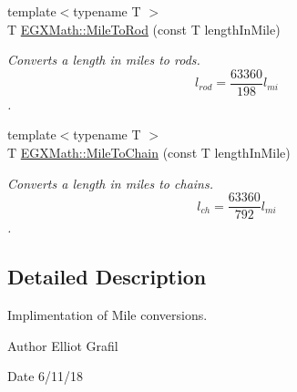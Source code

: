 \begin{DoxyCompactItemize}
{\footnotesize template$<$typename T $>$ }\\T \mbox{\hyperlink{group___e_g_x_math-_conversions-_length_conversions-_imperial-_mile-_surveyors_gae7e968004f761942f7d296ef66f1f93a}{E\+G\+X\+Math\+::\+Mile\+To\+Rod}} (const T length\+In\+Mile)
\begin{DoxyCompactList}\small\item\em Converts a length in miles to rods. \[ l_{rod}= \frac{63360}{198} l_{mi} \]. \end{DoxyCompactList}\item 
{\footnotesize template$<$typename T $>$ }\\T \mbox{\hyperlink{group___e_g_x_math-_conversions-_length_conversions-_imperial-_mile-_surveyors_gae3b09627ed639defe81e025bf827c8d7}{E\+G\+X\+Math\+::\+Mile\+To\+Chain}} (const T length\+In\+Mile)
\begin{DoxyCompactList}\small\item\em Converts a length in miles to chains. \[ l_{ch}= \frac{63360}{792} l_{mi} \]. \end{DoxyCompactList}\end{DoxyCompactItemize}


\subsection{Detailed Description}
Implimentation of Mile conversions. 

\begin{DoxyAuthor}{Author}
Elliot Grafil 
\end{DoxyAuthor}
\begin{DoxyDate}{Date}
6/11/18 
\end{DoxyDate}
